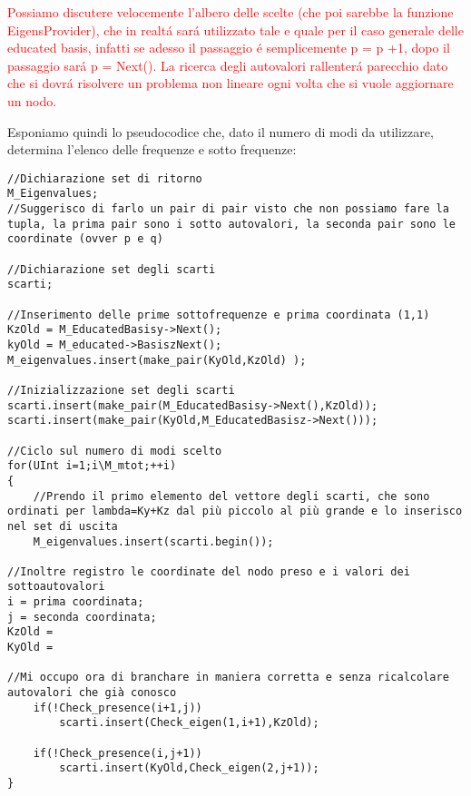 \textcolor{red}{Possiamo discutere velocemente l'albero delle scelte (che poi sarebbe la funzione EigensProvider), che in realt\'a sar\'a utilizzato tale e quale per il caso generale delle educated basis, infatti se adesso il passaggio \'e semplicemente p = p +1, dopo il passaggio sar\'a p = Next().
La ricerca degli autovalori rallenter\'a parecchio dato che si dovr\'a risolvere un problema non lineare ogni volta che si vuole aggiornare un nodo.}

Esponiamo quindi lo pseudocodice che, dato il numero di modi da utilizzare, determina l'elenco delle frequenze e sotto frequenze:


\begin{lstlisting}
//Dichiarazione set di ritorno
M_Eigenvalues;
//Suggerisco di farlo un pair di pair visto che non possiamo fare la tupla, la prima pair sono i sotto autovalori, la seconda pair sono le coordinate (ovver p e q)

//Dichiarazione set degli scarti
scarti;

//Inserimento delle prime sottofrequenze e prima coordinata (1,1)
KzOld = M_EducatedBasisy->Next();
kyOld = M_educated->BasiszNext();
M_eigenvalues.insert(make_pair(KyOld,KzOld) );

//Inizializzazione set degli scarti
scarti.insert(make_pair(M_EducatedBasisy->Next(),KzOld));
scarti.insert(make_pair(KyOld,M_EducatedBasisz->Next()));

//Ciclo sul numero di modi scelto
for(UInt i=1;i\M_mtot;++i)
{
	//Prendo il primo elemento del vettore degli scarti, che sono ordinati per lambda=Ky+Kz dal più piccolo al più grande e lo inserisco nel set di uscita
	M_eigenvalues.insert(scarti.begin());

//Inoltre registro le coordinate del nodo preso e i valori dei sottoautovalori
i = prima coordinata;
j = seconda coordinata;
KzOld =  
KyOld =

//Mi occupo ora di branchare in maniera corretta e senza ricalcolare autovalori che già conosco
	if(!Check_presence(i+1,j))
		scarti.insert(Check_eigen(1,i+1),KzOld);

	if(!Check_presence(i,j+1))		
		scarti.insert(KyOld,Check_eigen(2,j+1));
}
\end{lstlisting}

